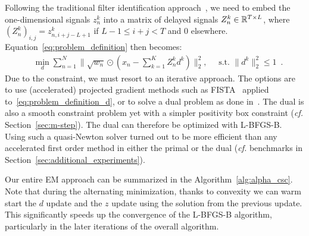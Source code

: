 Following the traditional filter identification approach~\citep{moulines1995subspace}, we need to embed the one-dimensional signals $z_n^k$ into a matrix of delayed signals $Z_n^{k} \in \mathbb{R}^{T \times L}$, where $ (Z_n^{k})_{i,j} = z_{n,i + j - L + 1}^k$ if $ L - 1 \le i+j < T$ and $0$ elsewhere. Equation~\eqref{eq:problem_definition} then becomes:
%
\begin{align}
& \min_{d} \sum_{n=1}^{N} \|\sqrt{w_n} \odot (x_{n} - \sum_{k=1}^{K}Z_{n}^{k}d^{k})\|_{2}^{2}, \quad \text{  s.t.  } \|d^k\|_2^2 \leq 1 \enspace.
\label{eq:problem_definition_d}
\end{align}
%
Due to the constraint, we must resort to an iterative approach. The options are to use (accelerated) projected gradient methods such as FISTA~\citep{beck2009fast} applied to~\eqref{eq:problem_definition_d}, or to solve a dual problem as done in~\cite{Grosse-etal:2007}. The dual is also a smooth constraint problem yet with a simpler positivity box constraint (\textit{cf.} Section~\ref{sec:m-step}). The dual can therefore be optimized with L-BFGS-B. Using such a quasi-Newton solver turned out to be more efficient than any accelerated first order method in either the primal or the dual (\textit{cf.} benchmarks in Section~\ref{sec:additional_experiments}).
%




Our entire \ac{EM} approach can be summarized in the Algorithm~\ref{alg:alpha_csc}.
Note that during the alternating minimization, thanks to convexity we can warm start the $d$ update and the $z$ update using the solution from the previous update. This significantly speeds up the convergence of the L-BFGS-B algorithm, particularly in the later iterations of the overall algorithm.


